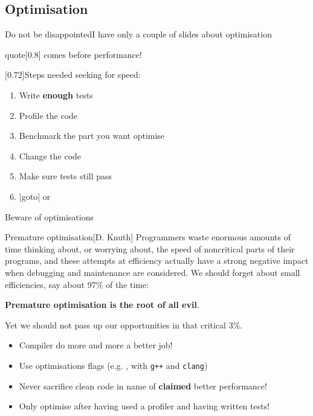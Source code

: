 \subsection{Optimisation}
\begin{frame}{Do not be disappointed}{I have only a couple of slides about optimisation}
    \begin{varblock}{quote}[0.8\textwidth]{}
        \normalfont\Large{} comes before \alert{performance}!
    \end{varblock}
    \begin{varblock*}{}[0.72\textwidth]{Steps needed seeking for speed:}
        \begin{enumerate}
            \item Write \textbf{enough} tests
            \item Profile the code
            \item Benchmark the part you want optimise
            \item Change the code 
            \item Make sure tests still pass
            \item \CPP|goto| \; or 
        \end{enumerate}
    \end{varblock*}
\end{frame}
\begin{frame}{Beware of optimisations}
    \vspace{-5mm}
    \begin{quoteblock}{Premature optimisation}[D. Knuth]
        Programmers waste enormous amounts of time thinking about, or worrying about,
        the speed of noncritical parts of their programs, and these attempts at efficiency
        actually have a strong negative impact when debugging and maintenance are considered.
        We should forget about small efficiencies, say about 97\% of the time:
        \par\smallskip
        \centerline{\alert{\textbf{Premature optimisation is the root of all evil}.}}
        \par\smallskip
        Yet we should not pass up our opportunities in that critical 3\%.
    \end{quoteblock}
    \vspace{-3mm}
    \begin{itemize}
        \item Compiler do more and more a better job!
        \item Use optimisations flags (e.g. ,  with \texttt{g++} and \texttt{clang})
        \item \alert{Never} sacrifice clean code in name of \textbf{claimed} better performance!
        \item Only optimise after having used a profiler and having written tests!
    \end{itemize}
\end{frame}
